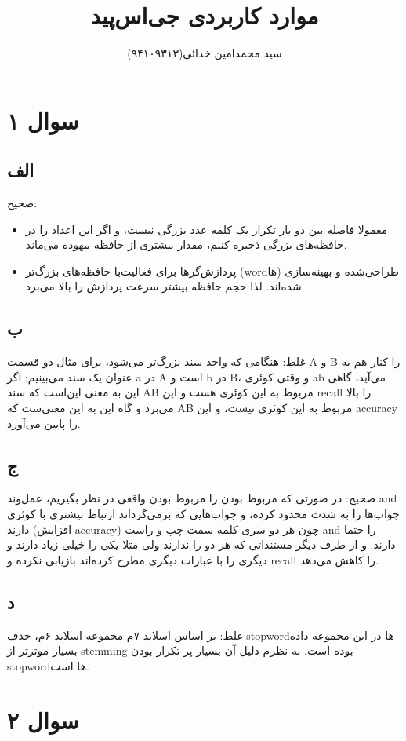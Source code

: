 \documentclass[11pt]{article}
\title{
موارد کاربردی جی‌اس‌پید
}
\author{سید محمد‌امین خدائی(۹۴۱۰۹۳۱۳)}
\begin{document}
\maketitle
\section{سوال ۱}
\subsection{الف}
صحیح: 
\begin{itemize}
\item
معمولا فاصله‌ بین دو بار تکرار یک کلمه عدد بزرگی نیست، و اگر این اعداد را در حافظه‌های بزرگی ذخیره کنیم،‌ مقدار بیشتری از حافظه بیهوده می‌ماند.
\item
پردازش‌گر‌ها برای فعالیت‌با حافظه‌های بزرگ‌تر (wordها) طراحی‌شده و بهینه‌سازی شده‌اند. لذا حجم حافظه بیشتر سرعت پردازش را بالا می‌برد.
\end{itemize}
\subsection{ب}
غلط: هنگامی که واحد سند بزرگ‌تر می‌شود، برای مثال دو قسمت A و B را کنار هم به عنوان یک سند می‌بینیم: اگر a در A است و b در B، و وقتی کوئری ab می‌آید، گاهی این به معنی این‌است که سند AB مربوط به این کوئری هست و این recall را بالا می‌برد و گاه این به این معنی‌ست که AB مربوط به این کوئری نیست، و این accuracy را پایین می‌آورد.
\subsection{ج}
صحیح: در صورتی که مربوط بودن را مربوط بودن واقعی در نظر بگیریم، عمل‌وند and جواب‌ها را به شدت محدود کرده، و جواب‌هایی که برمی‌گرداند ارتباط بیشتری با کوئری دارند (افزایش accuracy) چون هر دو سری کلمه سمت چپ و راست and را حتما دارند. و از طرف دیگر مستنداتی که هر دو را ندارند ولی مثلا یکی را خیلی زیاد دارند و دیگری را با عبارات دیگری مطرح کرده‌اند بازیابی نکرده و recall را کاهش می‌دهد.
\subsection{د}
غلط: بر اساس اسلاید ۷م مجموعه اسلاید ۶م، 	حذف stopword‌ها در این مجموعه داده بسیار موثر‌تر از stemming بوده است. به نظرم دلیل آن بسیار پر تکرار بودن stopwordها است.

\section{سوال ۲}
\end{document}
